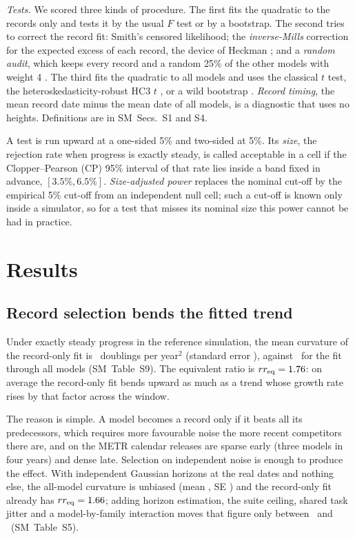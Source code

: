 \documentclass[aps,pre,twocolumn,superscriptaddress,nofootinbib,10pt]{revtex4-2}
\newcommand{\SM}{SM}
\newcommand{\rreq}{rr_{\rm eq}}
\begin{document}
\emph{Tests.} We scored three kinds of procedure. The first fits the quadratic to the records only and tests it by the usual $F$ test or by a bootstrap. The second tries to correct the record fit: Smith's censored likelihood; the \emph{inverse-Mills} correction for the expected excess of each record, the device of Heckman \cite{heckman1979}; and a \emph{random audit}, which keeps every record and a random 25\% of the other models with weight 4 \cite{horvitz1952}. The third fits the quadratic to all models and uses the classical $t$ test, the heteroskedasticity-robust HC3 $t$ \cite{mackinnon1985}, or a wild bootstrap \cite{wu1986,davidson2008}. \emph{Record timing}, the mean record date minus the mean date of all models, is a diagnostic that uses no heights. Definitions are in \SM\ Secs.~S1 and S4.

A test is run upward at a one-sided 5\% and two-sided at 5\%. Its \emph{size}, the rejection rate when progress is exactly steady, is called acceptable in a cell if the Clopper--Pearson (CP) \cite{clopper1934} 95\% interval of that rate lies inside a band fixed in advance, $[3.5\%,6.5\%]$. \emph{Size-adjusted power} replaces the nominal cut-off by the empirical 5\% cut-off from an independent null cell; such a cut-off is known only inside a simulator, so for a test that misses its nominal size this power cannot be had in practice.

\section{Results}\label{sec:res}

\subsection{Record selection bends the fitted trend}\label{sec:bias}
Under exactly steady progress in the reference simulation, the mean curvature of the record-only fit is \biasSota\ doublings per year$^2$ (standard error \biasSeSota), against \biasAll\ for the fit through all models (\SM\ Table~S9). The equivalent ratio is $\rreq=\biasRrSota$: on average the record-only fit bends upward as much as a trend whose growth rate rises by that factor across the window.

The reason is simple. A model becomes a record only if it beats all its predecessors, which requires more favourable noise the more recent competitors there are, and on the METR calendar releases are sparse early (three models in four years) and dense late. Selection on independent noise is enough to produce the effect. With independent Gaussian horizons at the real dates and nothing else, the all-model curvature is unbiased (mean \ladZeroAll, SE \ladZeroSe) and the record-only fit already has $\rreq=\ladZeroRecRr$; adding horizon estimation, the suite ceiling, shared task jitter and a model-by-family interaction moves that figure only between \ladRecRrMin\ and \ladRecRrMax\ (\SM\ Table~S5).
\end{document}
